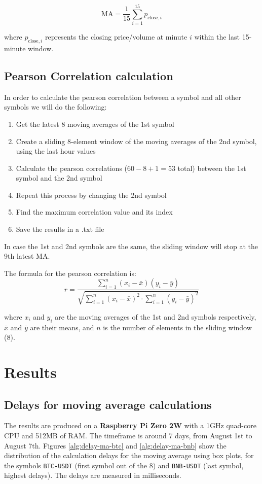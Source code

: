 \documentclass{article}
\begin{document}
\begin{equation*}
\text{MA} = \frac{1}{15} \sum_{i=1}^{15} p_{\text{close},i}
\end{equation*}

where $p_{\text{close},i}$ represents the closing price/volume at minute $i$ within the last 15-minute window.


\subsection{Pearson Correlation calculation}
In order to calculate the pearson correlation between a symbol and all other symbols we will do the following:

\begin{enumerate}
    \item Get the latest 8 moving averages of the 1st symbol
    \item Create a sliding 8-element window of the moving averages of the 2nd symbol, using the last hour values
    \item Calculate the pearson correlations ($60-8+1=53$ total) between the 1st symbol and the 2nd symbol
    \item Repeat this process by changing the 2nd symbol
    \item Find the maximum correlation value and its index
    \item Save the results in a .txt file
\end{enumerate}

In case the 1st and 2nd symbols are the same, the sliding window will stop at the 9th latest MA.

The formula for the pearson correlation is:
\begin{equation*}
r = \frac{\sum_{i=1}^{n} (x_i - \bar{x})(y_i - \bar{y})}{\sqrt{\sum_{i=1}^{n} (x_i - \bar{x})^2 \cdot \sum_{i=1}^{n} (y_i - \bar{y})^2}}
\end{equation*}

where $x_i$ and $y_i$ are the moving averages of the 1st and 2nd symbols respectively, $\bar{x}$ and $\bar{y}$ are their means, and $n$ is the number of elements in the sliding window (8).

\section{Results}

\subsection{Delays for moving average calculations}
The results are produced on a \textbf{Raspberry Pi Zero 2W} with a 1GHz quad-core CPU and 512MB of RAM.
The timeframe is around 7 days, from August 1st to August 7th.
Figures \ref{alg:delay-ma-btc} and \ref{alg:delay-ma-bnb} show the distribution of the calculation delays 
for the moving average using box plots, for the symbols \texttt{BTC-USDT} (first symbol out of the 8) 
and \texttt{BNB-USDT} (last symbol, highest delays). The delays are measured in milliseconds.
\end{document}
